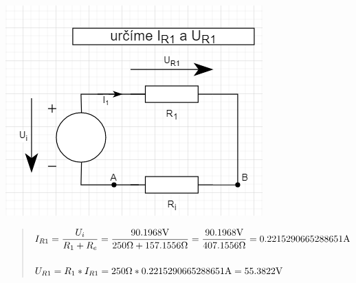 \begin{figure}[H]
    \centering
    \includegraphics[scale=0.5]{picturesFor2Uloha/5.png}
    \begin{quote}
        \centering
	   $I_{R1} = \dfrac{U_i}{R_1 + R_e} = \dfrac{90.1968\Vo}{250\Omega + 157.1556\Omega}
	   = \dfrac{90.1968\Vo}{407.1556\Omega} = 0.2215290665288651\Am$ \\~\\
	   $U_{R1} = R_1 * I_{R1} = 250\Omega * 0.2215290665288651\Am = 55.3822\Vo$
    \end{quote}
\end{figure}